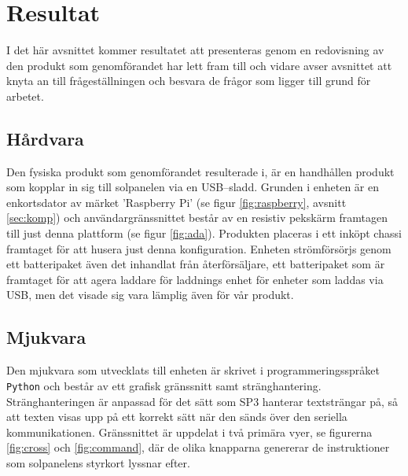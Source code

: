 \documentclass{article}
\begin{document}



    \newpage

    \section{Resultat} %
    \label{sec:resultat}
        I det här avsnittet kommer resultatet att presenteras genom en redovisning av den produkt som genomförandet har lett fram till och 
        vidare avser avsnittet att knyta an till frågeställningen och besvara de frågor som ligger till grund för arbetet. \\

        \subsection{Hårdvara} %
        \label{sub:h_rdvara}
        Den fysiska produkt som genomförandet resulterade i, är en handhållen produkt som kopplar in sig till sol\-panel\-en via en USB--sladd. Grunden i enheten är en enkorts\-dator av märket 'Raspberry Pi' (se figur \ref{fig:raspberry}, avsnitt \ref{sec:komp}) och användargränssnittet består av en resistiv pekskärm framtagen till just denna plattform \cite{Ada} (se figur \ref{fig:ada}). Produkten placeras i ett inköpt chassi framtaget för att husera just denna konfiguration. Enheten strömförsörjs genom ett batteripaket även det inhandlat från återförsäljare, ett batteripaket som är framtaget för att agera laddare för laddnings enhet för enheter som laddas via USB, men det visade sig vara lämplig även för vår produkt.

        \subsection{Mjukvara} %
        \label{sub:mjukvara}
         Den mjukvara som utvecklats till enheten är skrivet i programmeringsspråket \texttt{Python} och består av ett grafisk gränssnitt samt stränghantering. Stränghanteringen är anpassad för det sätt som SP3 hanterar textsträngar på, så att texten visas upp på ett korrekt sätt när den sänds över den seriella kommunikationen. Gränssnittet är uppdelat i två primära vyer, se figurerna \ref{fig:cross} och \ref{fig:command}, där de olika knapparna genererar de instruktioner som solpanelens styrkort lyssnar efter. \\
\end{document}
